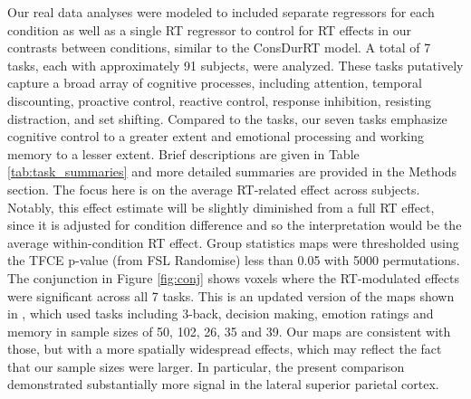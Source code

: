 \documentclass[titlepage,12pt] {article}
\begin{document}
Our real data analyses were modeled to included separate regressors for each condition as well as a single RT regressor to control for RT effects in our contrasts between conditions, similar to the ConsDurRT model.  A total of 7 tasks, each with approximately 91 subjects, were analyzed. These tasks putatively capture a broad array of cognitive processes, including attention, temporal discounting, proactive control, reactive control, response inhibition, resisting distraction, and set shifting. Compared to the \citet{yarkoni_bold_2009} tasks, our seven tasks emphasize cognitive control to a greater extent and emotional processing and working memory to a lesser extent. Brief descriptions are given in Table \ref{tab:task_summaries} and more detailed summaries are provided in the Methods section.   The focus here is on the average RT-related effect across subjects.  Notably, this effect estimate will be slightly diminished from a full RT effect, since it is adjusted for condition difference and so the interpretation would be the average within-condition RT effect. Group statistics maps were thresholded using the TFCE p-value (from FSL Randomise) less than 0.05 with 5000 permutations.  The conjunction in Figure \ref{fig:conj} shows voxels where the RT-modulated effects were significant across all 7 tasks.  This is an updated version of the maps shown in \citet{yarkoni_bold_2009}, which used tasks including  3-back, decision making, emotion ratings and memory in sample sizes of 50, 102, 26, 35 and 39.  Our maps are consistent with those, but with a more spatially widespread effects, which may reflect the fact that our sample sizes were larger. In particular, the present comparison demonstrated substantially more signal in the lateral superior parietal cortex.
\end{document}
